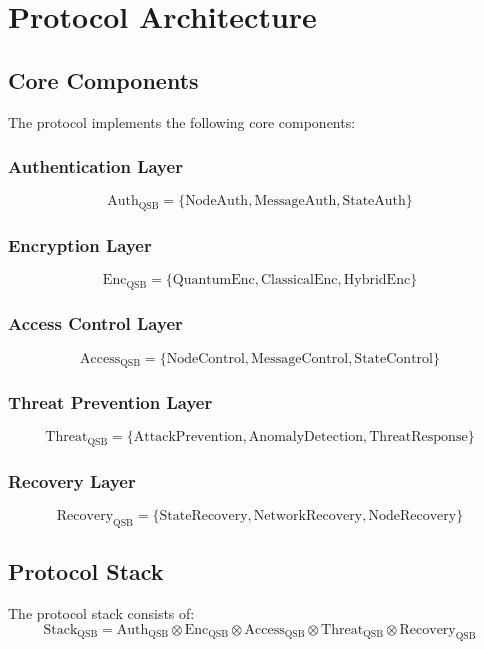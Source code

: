 \documentclass[12pt]{article}
\begin{document}
\section{Protocol Architecture}
\subsection{Core Components}
The protocol implements the following core components:
\subsubsection{Authentication Layer}
\begin{equation}
\text{Auth}_{\text{QSB}} = \{\text{NodeAuth}, \text{MessageAuth}, \text{StateAuth}\}
\end{equation}
\subsubsection{Encryption Layer}
\begin{equation}
\text{Enc}_{\text{QSB}} = \{\text{QuantumEnc}, \text{ClassicalEnc}, \text{HybridEnc}\}
\end{equation}
\subsubsection{Access Control Layer}
\begin{equation}
\text{Access}_{\text{QSB}} = \{\text{NodeControl}, \text{MessageControl}, \text{StateControl}\}
\end{equation}
\subsubsection{Threat Prevention Layer}
\begin{equation}
\text{Threat}_{\text{QSB}} = \{\text{AttackPrevention}, \text{AnomalyDetection}, \text{ThreatResponse}\}
\end{equation}
\subsubsection{Recovery Layer}
\begin{equation}
\text{Recovery}_{\text{QSB}} = \{\text{StateRecovery}, \text{NetworkRecovery}, \text{NodeRecovery}\}
\end{equation}
\subsection{Protocol Stack}
The protocol stack consists of:
\begin{equation}
\text{Stack}_{\text{QSB}} = \text{Auth}_{\text{QSB}} \otimes \text{Enc}_{\text{QSB}} \otimes \text{Access}_{\text{QSB}} \otimes \text{Threat}_{\text{QSB}} \otimes \text{Recovery}_{\text{QSB}}
\end{equation}
\end{document}
